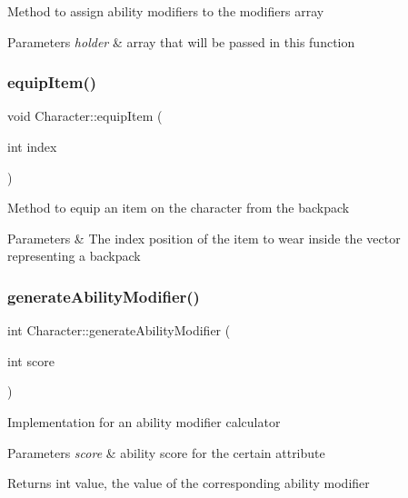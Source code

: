 Method to assign ability modifiers to the modifiers array 
\begin{DoxyParams}{Parameters}
{\em holder} & array that will be passed in this function \\
\hline
\end{DoxyParams}
\hypertarget{class_character_a2bbde472407d0c398cb602a45f5eec30}{}\label{class_character_a2bbde472407d0c398cb602a45f5eec30} 
\subsubsection{\texorpdfstring{equip\+Item()}{equipItem()}}
{\footnotesize\ttfamily void Character\+::equip\+Item (\begin{DoxyParamCaption}\item[{int}]{index }\end{DoxyParamCaption})}

Method to equip an item on the character from the backpack 
\begin{DoxyParams}{Parameters}
{\em } & The index position of the item to wear inside the vector representing a backpack \\
\hline
\end{DoxyParams}
\hypertarget{class_character_af3700e847620a19ada153eb10e600c22}{}\label{class_character_af3700e847620a19ada153eb10e600c22} 
\subsubsection{\texorpdfstring{generate\+Ability\+Modifier()}{generateAbilityModifier()}}
{\footnotesize\ttfamily int Character\+::generate\+Ability\+Modifier (\begin{DoxyParamCaption}\item[{int}]{score }\end{DoxyParamCaption})}

Implementation for an ability modifier calculator 
\begin{DoxyParams}{Parameters}
{\em score} & ability score for the certain attribute \\
\hline
\end{DoxyParams}
\begin{DoxyReturn}{Returns}
int value, the value of the corresponding ability modifier 
\end{DoxyReturn}
\hypertarget{class_character_a10f27e812da8b25d4f44dbf6f3533fb2}{}\label{class_character_a10f27e812da8b25d4f44dbf6f3533fb2} 
